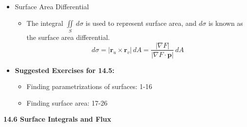 \documentclass[12pt]{article}
\renewcommand{\vec}[1]{\mathbf{#1}}
\newcommand{\<}{\left<}
\renewcommand{\>}{\right>}
\begin{document}
\begin{itemize}
  \item Surface Area Differential
  
    \begin{itemize}
    \item The integral $\iint\limits_S\, d\sigma$ is used to represent surface area, and $d\sigma$ is known as the surface area differential.
     \[d\sigma = |\vec{r}_u\times\vec{r}_v|\,dA = \frac{|\nabla F|}{|\nabla F \cdot \vec{p}|}\,dA\]
    \end{itemize}
        
  \item \textbf{Suggested Exercises for 14.5:}
  
    \begin{itemize}
    \item Finding parametrizations of surfaces: 1-16
    \item Finding surface area: 17-26
    \end{itemize}
    
  \end{itemize}
  
  \newpage
  
  \centerline{\bf 14.6 Surface Integrals and Flux}
  
\end{document}

